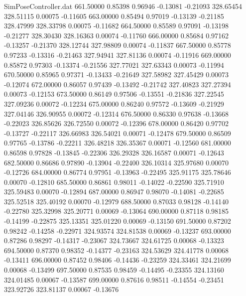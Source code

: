 \begin{filecontents}{SimPoseController.dat}
 661.50000    0.85398    0.96946    -0.13081   -0.21093  328.65454  328.51115    0.00075   -0.11605
 663.00000    0.85494    0.97019    -0.13139   -0.21185  328.47999  328.33798    0.00075   -0.11682
 664.50000    0.85589    0.97091    -0.13198   -0.21277  328.30430  328.16363    0.00074   -0.11760
 666.00000    0.85684    0.97162    -0.13257   -0.21370  328.12744  327.98809    0.00074   -0.11837
 667.50000    0.85778    0.97233    -0.13316   -0.21463  327.94941  327.81136    0.00074   -0.11916
 669.00000    0.85872    0.97303    -0.13374   -0.21556  327.77021  327.63343    0.00073   -0.11994
 670.50000    0.85965    0.97371    -0.13433   -0.21649  327.58982  327.45429    0.00073   -0.12074
 672.00000    0.86057    0.97439    -0.13492   -0.21742  327.40823  327.27394    0.00073   -0.12153
 673.50000    0.86149    0.97506    -0.13551   -0.21836  327.22545  327.09236    0.00072   -0.12234
 675.00000    0.86240    0.97572    -0.13609   -0.21929  327.04146  326.90955    0.00072   -0.12314
 676.50000    0.86330    0.97638    -0.13668   -0.22023  326.85626  326.72550    0.00072   -0.12396
 678.00000    0.86420    0.97702    -0.13727   -0.22117  326.66983  326.54021    0.00071   -0.12478
 679.50000    0.86509    0.97765    -0.13786   -0.22211  326.48218  326.35367    0.00071   -0.12560
 681.00000    0.86598    0.97828    -0.13845   -0.22306  326.29328  326.16587    0.00071   -0.12643
 682.50000    0.86686    0.97890    -0.13904   -0.22400  326.10314  325.97680    0.00070   -0.12726
 684.00000    0.86774    0.97951    -0.13963   -0.22495  325.91175  325.78646    0.00070   -0.12810
 685.50000    0.86861    0.98011    -0.14022   -0.22590  325.71910  325.59483    0.00070   -0.12894
 687.00000    0.86947    0.98070    -0.14081   -0.22685  325.52518  325.40192    0.00070   -0.12979
 688.50000    0.87033    0.98128    -0.14140   -0.22780  325.32998  325.20771    0.00069   -0.13064
 690.00000    0.87118    0.98185    -0.14199   -0.22875  325.13351  325.01220    0.00069   -0.13150
 691.50000    0.87202    0.98242    -0.14258   -0.22971  324.93574  324.81538    0.00069   -0.13237
 693.00000    0.87286    0.98297    -0.14317   -0.23067  324.73667  324.61725    0.00068   -0.13323
 694.50000    0.87370    0.98352    -0.14377   -0.23163  324.53629  324.41778    0.00068   -0.13411
 696.00000    0.87452    0.98406    -0.14436   -0.23259  324.33461  324.21699    0.00068   -0.13499
 697.50000    0.87535    0.98459    -0.14495   -0.23355  324.13160  324.01485    0.00067   -0.13587
 699.00000    0.87616    0.98511    -0.14554   -0.23451  323.92726  323.81137    0.00067   -0.13676

\end{filecontents}
